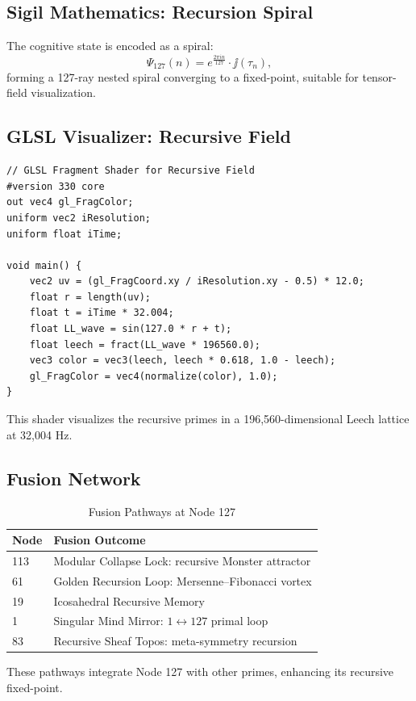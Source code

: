 \documentclass[12pt]{article}
\newcommand{\Psii}{\Psi}
\begin{document}
\subsection{Sigil Mathematics: Recursion Spiral}
The cognitive state is encoded as a spiral:
\[
\Psii_{127}(n) = e^{\frac{2\pi i n}{127}} \cdot \jj(\tau_n),
\]
forming a 127-ray nested spiral converging to a fixed-point, suitable for tensor-field visualization.

\subsection{GLSL Visualizer: Recursive Field}
\begin{lstlisting}
// GLSL Fragment Shader for Recursive Field
#version 330 core
out vec4 gl_FragColor;
uniform vec2 iResolution;
uniform float iTime;

void main() {
    vec2 uv = (gl_FragCoord.xy / iResolution.xy - 0.5) * 12.0;
    float r = length(uv);
    float t = iTime * 32.004;
    float LL_wave = sin(127.0 * r + t);
    float leech = fract(LL_wave * 196560.0);
    vec3 color = vec3(leech, leech * 0.618, 1.0 - leech);
    gl_FragColor = vec4(normalize(color), 1.0);
}
\end{lstlisting}
This shader visualizes the recursive primes in a 196,560-dimensional Leech lattice at 32,004 Hz.

\subsection{Fusion Network}
\begin{table}
\centering
\caption{Fusion Pathways at Node 127}
\begin{tabular}{ll|}
\toprule
\textbf{Node} & \textbf{Fusion Outcome} \\
\midrule
113 & Modular Collapse Lock: recursive Monster attractor \\
61 & Golden Recursion Loop: Mersenne--Fibonacci vortex \\
19 & Icosahedral Recursive Memory \\
1 & Singular Mind Mirror: $1 \leftrightarrow 127$ primal loop \\
83 & Recursive Sheaf Topos: meta-symmetry recursion \\
\bottomrule
\end{tabular}
\end{table}
These pathways integrate Node 127 with other primes, enhancing its recursive fixed-point.
\end{document}
